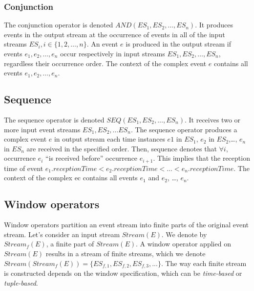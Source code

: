   \subsubsection{Conjunction}
  The conjunction operator is  denoted $AND(ES_1, ES_2, …, ES_n)$. It produces events in the output stream at the occurrence of events in all of the input streams $ES_i, i \in \{1, 2, …,n\}$. An event $e$ is produced in the output stream if events $e_1, e_2, …, e_n$ occur respectively in input streams $ES_1, ES_2, …, ES_n$, regardless their occurrence order. The context of the complex event $e$ contains all events $e_1, e_2, …, e_n$.
 
 \subsection{Sequence}
 The sequence operator is denoted $SEQ(ES_1, ES_2, …, ES_n)$. It receives two or more input event streams $ES_1, ES_2, … ES_n$. The sequence operator produces a complex event $e$ in output stream each time instances $e1$ in $ES_1$, $e_2$ in $ES_2$,…, $e_n$ in $ES_n$ are received in the specified order. 
 Then, sequence denotes that $\forall i$, occurrence $e_i$ “is received before” occurrence $e_{i+1}$. 
 This implies that the reception time of event $e_1.receptionTime < e_2.receptionTime < …< e_n.receptionTime$.
 The context of the complex ec contains all events $e_1$ and $e_2$, …, $e_n$. 
 
 \subsection{Window operators}
 Window operators partition an event stream into finite parts of the original event stream. Let's consider an input stream $Stream(E)$. We denote by $Stream_f(E)$, a finite part of $Stream(E)$. A window operator applied on $Stream(E)$ results in a stream of finite streams, which we denote $Stream(Stream_f(E))= \{ES_{f,1}, ES_{f,2}, ES_{f,3}, ...\}$.
 The way each finite stream is constructed depends on the window specification, which can be \textit{time-based} or \textit{tuple-based}.
